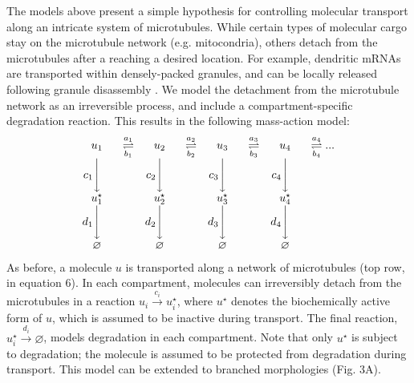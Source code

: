 \documentclass[10pt]{wlpeerj}
\begin{document}
The models above present a simple hypothesis for controlling molecular transport along an intricate system of microtubules.
While certain types of molecular cargo stay on the microtubule network (e.g. mitocondria), others detach from the microtubules after a reaching a desired location.
For example, dendritic mRNAs are transported within densely-packed granules, and can be locally released following granule disassembly \citep{Krichevsky_2001,Buxbaum_2014a}.
We model the detachment from the microtubule network as an irreversible process, and include a compartment-specific degradation reaction. This results in the following mass-action model:
\begin{equation}
\begin{array}{cccccccc}
u_1 & \overset{a_1}{\underset{b_1}{\rightleftharpoons}} &
u_2 & \overset{a_2}{\underset{b_2}{\rightleftharpoons}} &
u_3 & \overset{a_3}{\underset{b_3}{\rightleftharpoons}} &
u_4 & \overset{a_4}{\underset{b_4}{\rightleftharpoons}} ...
\\
c_1 \Bigg\downarrow \phantom{c_1} & &
c_2 \Bigg\downarrow \phantom{c_2} & &
c_3 \Bigg\downarrow \phantom{c_3} & &
c_4 \Bigg\downarrow \phantom{c_4} & 
\\
u_1^\star &  &
u_2^\star &  &
u_3^\star &  &
u_4^\star &   
\\
d_1 \Bigg\downarrow \phantom{d_1} & &
d_2 \Bigg\downarrow \phantom{d_2} & &
d_3 \Bigg\downarrow \phantom{d_3} & &
d_4 \Bigg\downarrow \phantom{d_4} & 
\\
\varnothing &  &
\varnothing &  &
\varnothing &  &
\varnothing &  
\end{array}
\end{equation}
As before, a molecule $u$ is transported along a network of microtubules (top row, in equation 6).
In each compartment, molecules can irreversibly detach from the microtubules in a reaction $u_i \xrightarrow{c_i} u_i^\star$, where $u^\star$ denotes the biochemically active form of $u$, which is assumed to be inactive during transport.
The final reaction, $u_i^\star \xrightarrow{d_i} \varnothing$, models degradation in each compartment.
Note that only $u^\star$ is subject to degradation; the molecule is assumed to be protected from degradation during transport.
This model can be extended to branched morphologies (Fig. 3A).
\end{document}

